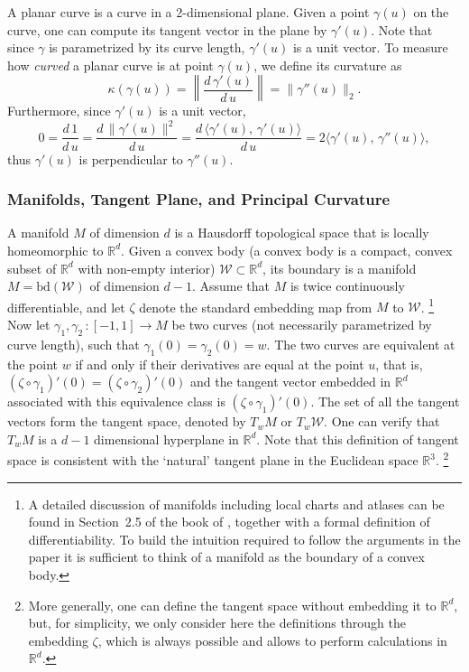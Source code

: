 \documentclass[english]{article}
\newcommand{\cW}{\mathcal{W}}
\newcommand{\real}{\mathbb{R}}
\newcommand{\R}{\mathbb{R}}
\newcommand{\bd}{\mathrm{bd}}
\begin{document}
A planar curve is a curve in a 2-dimensional plane. Given a point $\gamma(u)$ on the curve, one can compute its tangent vector in the plane by $\gamma'(u)$. Note that since $\gamma$ is parametrized by its curve length, $\gamma'(u)$ is a unit vector. To measure how \emph{curved} a planar curve is at point $\gamma(u)$, we define its curvature as 
\[
\kappa(\gamma(u)) = \left\| \frac{d\, \gamma'(u)}{d\, u}\right\| = \| \gamma''(u)\|_2. 
\]
Furthermore, since $\gamma'(u)$ is a unit vector, 
\[
0 = \frac{d\, 1}{d\, u} = \frac{d\, \|\gamma'(u)\|^2}{d\, u} = \frac{d\, \langle \gamma'(u),\, \gamma'(u)\rangle}{d\, u} = 2\langle \gamma'(u) ,\, \gamma''(u)\rangle,
\] 
thus $\gamma'(u)$ is perpendicular to $\gamma''(u)$. 

\subsubsection{Manifolds, Tangent Plane, and Principal Curvature}
\label{sec:app_manifold}
A manifold $M$ of dimension $d$ is a Hausdorff topological space that is locally homeomorphic to $\real^d$. 
Given a convex body (a convex body is a compact, convex subset of $\R^d$ with non-empty interior) $\cW \subset \real^d$, its boundary is a manifold $M = \bd(\cW)$ of dimension $d-1$. Assume that $M$ is twice continuously differentiable, and let $\zeta$ denote the standard embedding map from $M$ to $\cW$.%
\footnote{A detailed discussion of manifolds including local charts and atlases can be found in Section~2.5 of the book of  \citet{Sch14:ConvexBodies}, together with a formal definition of differentiability. To build the intuition required to follow the arguments in the paper it is sufficient to think of a manifold as the boundary of a convex body.}
Now let $\gamma_1,\gamma_2\,: [-1,1] \rightarrow M$ be two curves (not necessarily parametrized by curve length),  such that $\gamma_1(0) = \gamma_2(0)=w$. The two curves are equivalent at the point $w$ if and only if their derivatives are equal at the point $u$, that is, $(\zeta\circ\gamma_1)'(0) = (\zeta\circ\gamma_2)'(0)$ and the tangent vector embedded in $\real^d$ associated with this equivalence class is $(\zeta\circ\gamma_1)'(0)$. The set of all the tangent vectors form the tangent space, denoted by $T_{w}M$ or $T_w \cW$. 
One can verify that $T_wM$ is a $d-1$ dimensional hyperplane in $\real^d$. Note that this definition of tangent space is consistent with the `natural' tangent plane in the Euclidean space $\real^3$.%
\footnote{More generally, one can define the tangent space without embedding it to $\real^d$, but, for simplicity, we only consider here the definitions through the embedding $\zeta$, which is always possible and allows to perform calculations in $\real^d$.}
\end{document}
